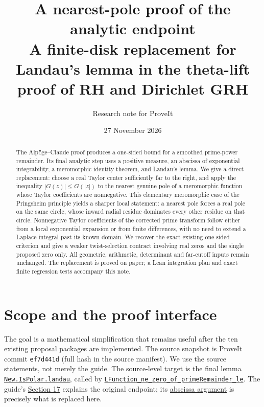 \documentclass[11pt]{article}
\title{A nearest-pole proof of the analytic endpoint\\\large A finite-disk replacement for Landau's lemma in the theta-lift proof of RH and Dirichlet GRH}
\author{Research note for ProveIt}
\date{27 November 2026}
\theoremstyle{remark}\newtheorem{remark}[theorem]{Remark}
\newcommand{\repo}{https://github.com/VladimirReshetnikov/ProveIt/blob/ef7d441dcb37ea944b7ac15731bb766f2e1354ea/Analysis/GeneralizedRiemannHypothesis/}
\newcommand{\src}[3]{\href{\repo Lean/grh/src/#1.lean\#L#2}{#3}}
\newcommand{\guide}[2]{\href{\repo docs/guide/theta_lifts_and_dirichlet_zeros.tex\#L#1}{#2}}
\begin{document}
\maketitle
\begin{abstract}
The Alp\"oge--Claude proof produces a one-sided bound for a smoothed prime-power remainder. Its final analytic step uses a positive measure, an abscissa of exponential integrability, a meromorphic identity theorem, and Landau's lemma. We give a direct replacement: choose a real Taylor center sufficiently far to the right, and apply the inequality $|G(z)|\le G(|z|)$ to the nearest genuine pole of a meromorphic function whose Taylor coefficients are nonnegative. This elementary meromorphic case of the Pringsheim principle yields a sharper local statement: a nearest pole forces a real pole on the same circle, whose inward radial residue dominates every other residue on that circle. Nonnegative Taylor coefficients of the corrected prime transform follow either from a local exponential expansion or from finite differences, with no need to extend a Laplace integral past its known domain. We recover the exact existing one-sided criterion and give a weaker twist-selection contract involving real zeros and the single proposed zero only. All geometric, arithmetic, determinant and far-cutoff inputs remain unchanged. The replacement is proved on paper; a Lean integration plan and exact finite regression tests accompany this note.
\end{abstract}
\tableofcontents
\section{Scope and the proof interface}
The goal is a mathematical simplification that remains useful after the ten existing proposal packages are implemented. The source snapshot is ProveIt commit \texttt{ef7d441d} (full hash in the source manifest). We use the source statements, not merely the guide. The source-level target is the final lemma \src{Lib/Analytic/Landau}{217}{\texttt{New.IsPolar.landau}}, called by \src{New/Reduction/Zeros/Criterion}{37}{\texttt{LFunction\_ne\_zero\_of\_}\allowbreak\texttt{primeRemainder\_le}}. The guide's \guide{1754}{Section 17} explains the original endpoint; its \guide{1947}{abscissa argument} is precisely what is replaced here.
\end{document}
